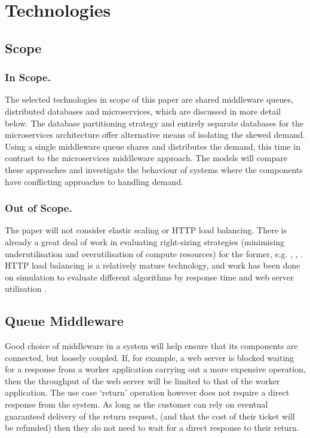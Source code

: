 %
%

\section{Technologies}\label{sec:technologies}

%
%
\subsection{Scope}
\subsubsection{In Scope.}  The selected technologies in scope of this paper are shared middleware queues, distributed databases and microservices, which are discussed in more detail below.  The database partitioning strategy and entirely separate databases for the microservices architecture offer alternative means of isolating the skewed demand.  Using a single middleware queue shares and distributes the demand, this time in contrast to the microservices middleware approach.  The models will compare these approaches and investigate the behaviour of systems where the components have conflicting approaches to handling demand.
\subsubsection{Out of Scope.}  The paper will not consider elastic scaling or HTTP load balancing.  There is already a great deal of work in evaluating right-sizing strategies (minimising underutilisation and overutilisation of compute resources) for the former, e.g. \cite{RN49}, \cite{RN62}, \cite{RN48}.  HTTP load balancing is a relatively mature technology, and work has been done on simulation to evaluate different algorithms by response time and web server utilisation \cite{RN55}.

%
%

\subsection{Queue Middleware}\label{sec:middleware}

Good choice of middleware in a system will help ensure that its components are connected, but loosely coupled.  If, for example, a web server is blocked waiting for a response from a worker application carrying out a more expensive operation, then the throughput of the web server will be limited to that of the worker application.  The use case `return' operation however does not require a direct response from the system.  As long as the customer can rely on eventual guaranteed delivery of the return request, (and that the cost of their ticket will be refunded) then they do not need to wait for a direct response to their return.

